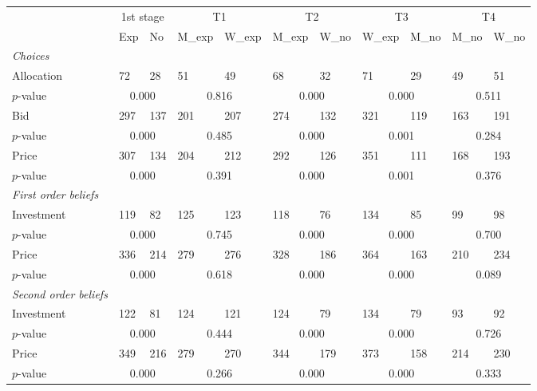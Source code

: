 \begin{tabular}{lll|ll|ll|ll|ll|}
  \toprule
  & \multicolumn{2}{c}{1st stage} &  \multicolumn{2}{c}{T1} &  \multicolumn{2}{c}{T2} &  \multicolumn{2}{c}{T3} &  \multicolumn{2}{c}{T4}\\
  & Exp & No & M\_exp & W\_exp & M\_exp & W\_no & W\_exp & M\_no & M\_no & W\_no   \\
  \midrule
\emph{Choices} & & & & &  & & & & &\\
Allocation & 72 & 28 & 51 & 49 & 68 & 32 & 71 & 29 & 49 & 51 \\
$p$-value & \multicolumn{2}{c|}{0.000} & \multicolumn{2}{c|}{0.816} & \multicolumn{2}{c|}{0.000} & \multicolumn{2}{c|}{0.000} & \multicolumn{2}{c|}{0.511}\\
Bid & 297 & 137 & 201 & 207 & 274 & 132 & 321 & 119 & 163 & 191 \\
$p$-value & \multicolumn{2}{c|}{0.000} & \multicolumn{2}{c|}{0.485} & \multicolumn{2}{c|}{0.000} & \multicolumn{2}{c|}{0.001} & \multicolumn{2}{c|}{0.284}\\
Price & 307 & 134 & 204 & 212 & 292 & 126 & 351 & 111 & 168 & 193 \\
$p$-value & \multicolumn{2}{c|}{0.000} & \multicolumn{2}{c|}{0.391} & \multicolumn{2}{c|}{0.000} & \multicolumn{2}{c|}{0.001} & \multicolumn{2}{c|}{0.376}\\
  \midrule
\emph{First order beliefs}  & & & & &  & & & & &\\
Investment & 119 & 82 & 125 & 123 & 118 & 76 & 134 & 85 & 99 & 98 \\
$p$-value & \multicolumn{2}{c|}{0.000} & \multicolumn{2}{c|}{0.745} & \multicolumn{2}{c|}{0.000} & \multicolumn{2}{c|}{0.000} & \multicolumn{2}{c|}{0.700}\\
Price & 336 & 214 & 279 & 276 & 328 & 186 & 364 & 163 & 210 & 234 \\
$p$-value & \multicolumn{2}{c|}{0.000} & \multicolumn{2}{c|}{0.618} & \multicolumn{2}{c|}{0.000} & \multicolumn{2}{c|}{0.000} & \multicolumn{2}{c|}{0.089}\\
  \midrule
\emph{Second order beliefs}  & & & & &  & & & & &\\
Investment & 122 & 81 & 124 & 121 & 124 & 79 & 134 & 79 & 93 & 92 \\
$p$-value & \multicolumn{2}{c|}{0.000} & \multicolumn{2}{c|}{0.444} & \multicolumn{2}{c|}{0.000} & \multicolumn{2}{c|}{0.000} & \multicolumn{2}{c|}{0.726}\\
Price & 349 & 216 & 279 & 270 & 344 & 179 & 373 & 158 & 214 & 230 \\
$p$-value & \multicolumn{2}{c|}{0.000} & \multicolumn{2}{c|}{0.266} & \multicolumn{2}{c|}{0.000} & \multicolumn{2}{c|}{0.000} & \multicolumn{2}{c|}{0.333}\\
  \midrule
\end{tabular}

